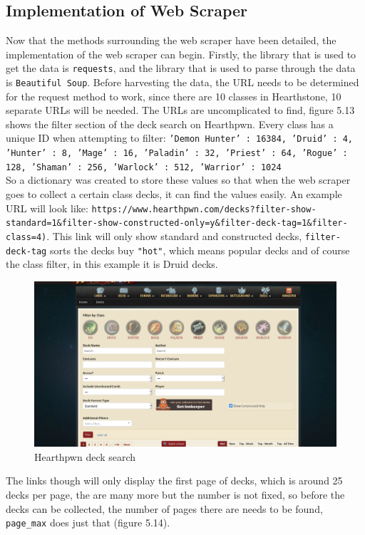 \documentclass{report} %
\begin{document}
\subsection{Implementation of Web Scraper}
Now that the methods surrounding the web scraper have been detailed, the implementation of the web scraper can begin. Firstly, the library that is used to get the data is \texttt{requests}, and the library that is used to parse through the data is \texttt{Beautiful Soup}. Before harvesting the data, the URL needs to be determined for the request method to work, since there are 10 classes in Hearthstone, 10 separate URLs will be needed. The URLs are uncomplicated to find, figure 5.13 shows the filter section of the deck search on Hearthpwn. Every class has a unique ID when attempting to filter: \texttt{'Demon Hunter' : 16384,
         'Druid' : 4,
         'Hunter' : 8,
         'Mage' : 16,
         'Paladin' : 32,
         'Priest' : 64,
         'Rogue' : 128,
         'Shaman' : 256,
         'Warlock' : 512,
         'Warrior' : 1024}\\
So a dictionary was created to store these values so that when the web scraper goes to collect a certain class decks, it can find the values easily. An example URL will look like: \nolinkurl{https://www.hearthpwn.com/decks?filter-show-standard=1&filter-show-constructed-only=y&filter-deck-tag=1&filter-class=4)}. This link will only show standard and constructed decks, \texttt{filter-deck-tag} sorts the decks buy \texttt{"hot"}, which means popular decks and of course the class filter, in this example it is Druid decks.
\begin{figure}[H]
\centering
\includegraphics[width=1\textwidth]{HSpwnDecks}
\caption{Hearthpwn deck search\protect}
\label{board}
\end{figure}

The links though will only display the first page of decks, which is around 25 decks per page, the are many more but the number is not fixed, so before the decks can be collected, the number of pages there are needs to be found, \nolinkurl{page_max} does just that (figure 5.14).
\end{document}
